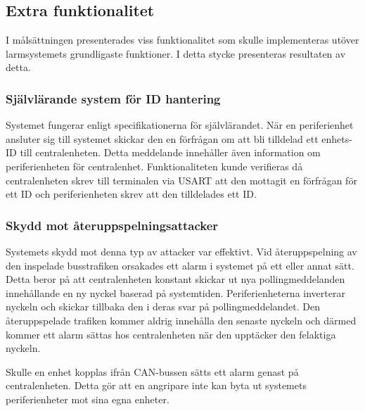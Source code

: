 \documentclass[a4paper]{article}
\newcommand{\todo}[1]{\marginpar{TODO: #1}\vspace{1cm}}
\begin{document}
\subsection{Extra funktionalitet}
I målsättningen presenterades viss funktionalitet som skulle implementeras utöver larmsystemets grundligaste funktioner.
I detta stycke presenteras resultaten av detta.

\subsubsection{Självlärande system för ID hantering}
Systemet fungerar enligt specifikationerna för självlärandet.
När en periferienhet ansluter sig till systemet skickar den en förfrågan om att bli tilldelad ett enhets-ID till centralenheten.
Detta meddelande innehåller även information om periferienheten för centralenhet.
Funktionaliteten kunde verifieras då centralenheten skrev till terminalen via USART att den mottagit en förfrågan för ett ID och periferienheten skrev att den tilldelades ett ID.

\subsubsection{Skydd mot återuppspelningsattacker}
Systemets skydd mot denna typ av attacker var effektivt.
Vid återuppspelning av den inspelade busstrafiken orsakades ett alarm i systemet på ett eller annat sätt.
Detta beror på att centralenheten konstant skickar ut nya pollingmeddelanden innehållande en ny nyckel baserad på systemtiden.
Periferienheterna inverterar nyckeln och skickar tillbaka den i deras svar på pollingmeddelandet.
Den återuppspelade trafiken kommer aldrig innehålla den senaste nyckeln och därmed kommer ett alarm sättas hos centralenheten när den upptäcker den felaktiga nyckeln.

Skulle en enhet kopplas ifrån CAN-bussen sätts ett alarm genast på centralenheten.
Detta gör att en angripare inte kan byta ut systemets periferienheter mot sina egna enheter.

\end{document}
